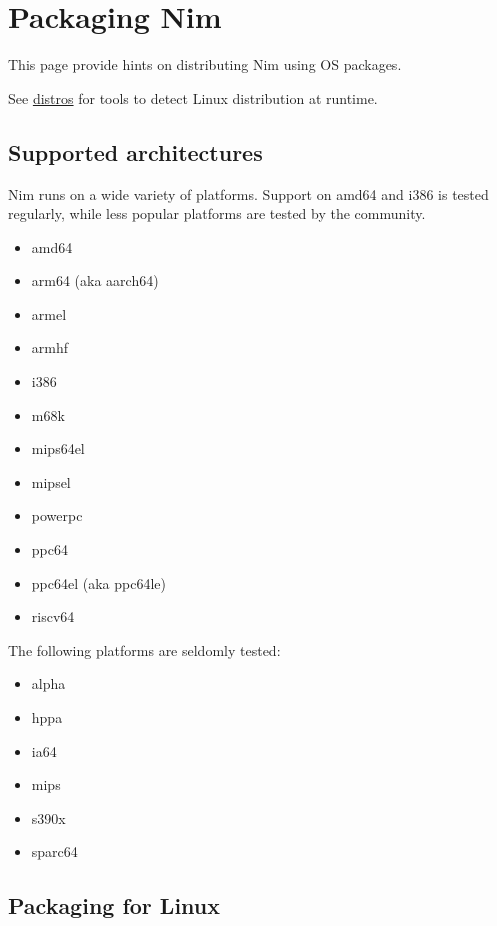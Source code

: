 \hypertarget{packaging-nim}{%
\section{Packaging Nim}\label{packaging-nim}}

This page provide hints on distributing Nim using OS packages.

See \href{distros.html}{distros} for tools to detect Linux distribution
at runtime.

\hypertarget{supported-architectures}{%
\subsection{Supported architectures}\label{supported-architectures}}

Nim runs on a wide variety of platforms. Support on amd64 and i386 is
tested regularly, while less popular platforms are tested by the
community.

\begin{itemize}
\tightlist
\item
  amd64
\item
  arm64 (aka aarch64)
\item
  armel
\item
  armhf
\item
  i386
\item
  m68k
\item
  mips64el
\item
  mipsel
\item
  powerpc
\item
  ppc64
\item
  ppc64el (aka ppc64le)
\item
  riscv64
\end{itemize}

The following platforms are seldomly tested:

\begin{itemize}
\tightlist
\item
  alpha
\item
  hppa
\item
  ia64
\item
  mips
\item
  s390x
\item
  sparc64
\end{itemize}

\hypertarget{packaging-for-linux}{%
\subsection{Packaging for Linux}\label{packaging-for-linux}}

